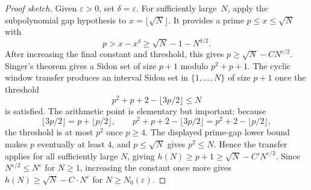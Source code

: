 \documentclass[10pt,a4paper]{amsart}
\begin{document}
\begin{proof}[Proof sketch]
Given $\varepsilon > 0$, set $\delta = \varepsilon$.  For sufficiently
large~$N$, apply the subpolynomial gap hypothesis to
\(x=\lfloor\sqrt N\rfloor\).  It provides a prime \(p\le x\le\sqrt N\) with
\[
  p>x-x^\delta\ge \sqrt N-1-N^{\delta/2}.
\]
After increasing the final constant and threshold, this gives
\(p\ge\sqrt N-CN^{\varepsilon/2}\).  Singer's theorem gives a Sidon set of size $p+1$
modulo $p^2+p+1$.  The cyclic window transfer produces an interval Sidon
set in $\{1,\dots,N\}$ of size $p+1$ once the threshold
\[
  p^2+p+2-\lfloor 3p/2\rfloor \le N
\]
is satisfied.  The arithmetic point is elementary but important: because
\[
  \lfloor 3p/2\rfloor = p+\lfloor p/2\rfloor,
  \qquad
  p^2+p+2-\lfloor 3p/2\rfloor
    = p^2+2-\lfloor p/2\rfloor,
\]
the threshold is at most \(p^2\) once \(p\ge4\).  The displayed prime-gap
lower bound makes \(p\) eventually at least \(4\), and \(p\le\sqrt N\) gives
\(p^2\le N\).  Hence the transfer applies for all sufficiently large \(N\),
giving \(h(N) \ge p+1 \ge \sqrt{N} - C' N^{\varepsilon/2}\).  Since
\(N^{\varepsilon/2}\le N^\varepsilon\) for \(N\ge1\), increasing the constant
once more gives \(h(N)\ge \sqrt N-C\cdot N^\varepsilon\) for
\(N\ge N_0(\varepsilon)\).
\end{proof}
\end{document}
